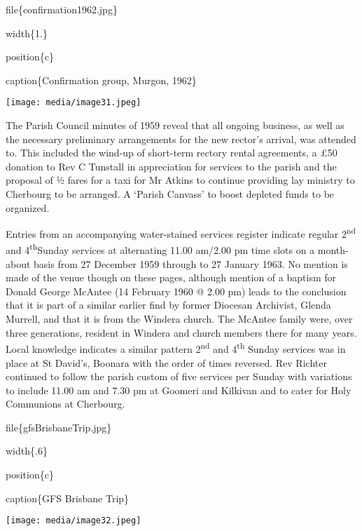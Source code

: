 file\{confirmation1962.jpg\}

width\{1.\}

position\{c\}

caption\{Confirmation group, Murgon, 1962\}

\texttt{[image: media/image31.jpeg]}

The Parish Council minutes of 1959 reveal that all ongoing business, as well as the necessary preliminary arrangements for the new rector's arrival, was attended to. This included the wind-up of short-term rectory rental agreements, a £50 donation to Rev C Tunstall in appreciation for services to the parish and the proposal of ½ fares for a taxi for Mr Atkins to continue providing lay ministry to Cherbourg to be arranged. A `Parish Canvass' to boost depleted funds to be organized.

Entries from an accompanying water-stained services register indicate regular 2\textsuperscript{nd} and 4\textsuperscript{th}Sunday services at alternating 11.00 am/2.00 pm time slots on a month-about basis from 27 December 1959 through to 27 January 1963. No mention is made of the venue though on these pages, although mention of a baptism for Donald George McAntee (14 February 1960 @ 2.00 pm) leads to the conclusion that it is part of a similar earlier find by former Diocesan Archivist, Glenda Murrell, and that it is from the Windera church. The McAntee family were, over three generations, resident in Windera and church members there for many years. Local knowledge indicates a similar pattern 2\textsuperscript{nd} and 4\textsuperscript{th} Sunday services was in place at St David's, Boonara with the order of times reversed. Rev Richter continued to follow the parish custom of five services per Sunday with variations to include 11.00 am and 7.30 pm at Goomeri and Kilkivan and to cater for Holy Communions at Cherbourg.

file\{gfsBrisbaneTrip.jpg\}

width\{.6\}

position\{c\}

caption\{GFS Brisbane Trip\}

\texttt{[image: media/image32.jpeg]}

